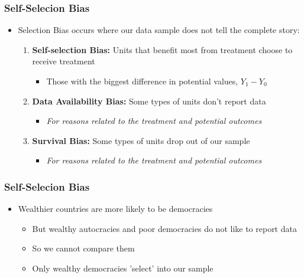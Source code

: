\documentclass[xcolor=x11names,compress]{beamer}\usepackage[]{graphicx}\usepackage[]{color}
\renewcommand{\(}{\begin{columns}}
\renewcommand{\)}{\end{columns}}
\newcommand{\<}[1]{\begin{column}{#1}}
\renewcommand{\>}{\end{column}}
\begin{document}
\begin{frame}
\frametitle{Self-Selecion Bias}
\begin{itemize}
\item Selection Bias occurs where our data sample does not tell the complete story:
\pause
\begin{enumerate}
\item \textbf{Self-selection Bias:} Units that benefit most from treatment choose to receive treatment
\begin{itemize}
\item Those with the biggest difference  in potential values, $Y_1 - Y_0$
\end{itemize}
\item \textbf{Data Availability Bias:} Some types of units don't report data
\begin{itemize}
\item \textit{For reasons related to the treatment and potential outcomes}
\end{itemize}
\item \textbf{Survival Bias:} Some types of units drop out of our sample
\begin{itemize}
\item \textit{For reasons related to the treatment and potential outcomes}
\end{itemize}
\end{enumerate}
\end{itemize}
\end{frame}

\begin{frame}
\frametitle{Self-Selecion Bias}
\begin{itemize}
\item Wealthier countries are more likely to be democracies
\pause
\begin{itemize}
\item But wealthy autocracies and poor democracies do not like to report data
\pause
\item So we cannot compare them
\pause
\item Only wealthy democracies 'select' into our sample
\end{itemize}
\end{itemize}
\end{frame}


\end{document}
